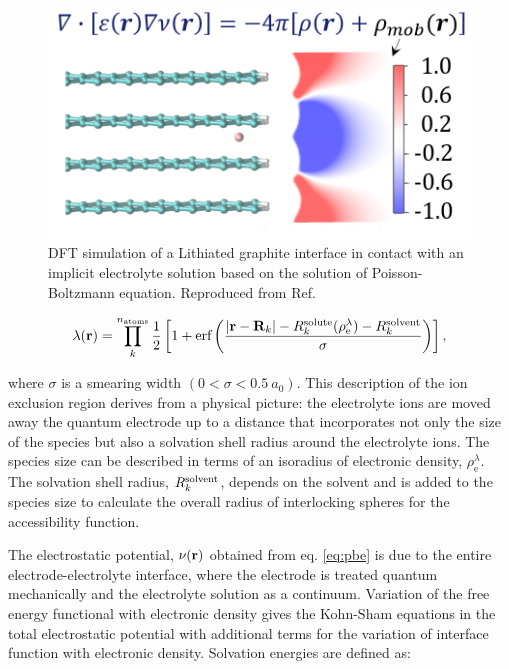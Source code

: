 \documentclass[../main.tex]{subfiles}
\begin{document}
\begin{figure}
    \centering
    \includegraphics[scale=0.7]{figures/DFT+Continuum.png}
    \caption{DFT simulation of a Lithiated graphite interface in contact with an implicit electrolyte solution based on the solution of Poisson-Boltzmann equation. Reproduced from Ref. }
    \label{fig:DFT+continuum}
\end{figure}

\begin{equation}
    \label{eq:access}
    \lambda\!\left(\mathbf{r}\right) = \prod\limits_{k}^{n_\textrm{atoms}}\frac{1}{2} \left[1+\textrm{erf}\left(\frac{|\textbf{r}-\textbf{R}_k|-R^{\rm solute}_k(\rho_{\textrm{e}}^\lambda)-R^{\rm solvent}_k}{\sigma}\right)\right],
\end{equation}

where $\sigma$ is a smearing width $(0<\sigma<0.5~a_0)$. This description of the ion exclusion region derives from a physical picture: the electrolyte ions are moved away the quantum electrode up to a distance that incorporates not only the size of the species but also a solvation shell radius around the electrolyte ions. The species size can be described in terms of an isoradius of electronic density, $\rho_{\textrm{e}}^\lambda$. The solvation shell radius, $R^{\rm solvent}_k$, depends on the solvent and is added to the species size to calculate the overall radius of interlocking spheres for the accessibility function.

The electrostatic potential, $\nu\!\left(\mathbf{r}\right)$ obtained from eq. \ref{eq:pbe} is due to the entire electrode-electrolyte interface, where the electrode is treated quantum mechanically and the electrolyte solution as a continuum. Variation of the free energy functional with electronic density gives the Kohn-Sham equations in the total electrostatic potential with additional terms for the variation of interface function with electronic density.\cite{Dziedzic2011, Ringe2016} Solvation energies are defined as:\cite{Ringe2016, Stein2019}
\end{document}
